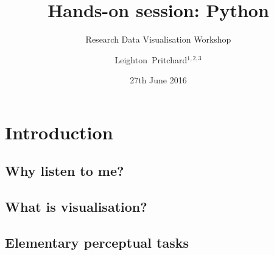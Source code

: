 

%



\title[RDVW: Python] %
{Hands-on session: Python}
\subtitle{Research Data Visualisation Workshop}
\author[Pritchard] %
{Leighton~Pritchard$^{1,2,3}$}
\date[27th June 2016] %
{27th June 2016}
\subject{Data Science, Data Analysis, Data Visualisation, Research Data Visualisation, Python, Programming}





\frame[plain]{\titlepage}



\section{Introduction}
\subsection{Why listen to me?}

\subsection{What is visualisation?}

\subsection{Elementary perceptual tasks}


